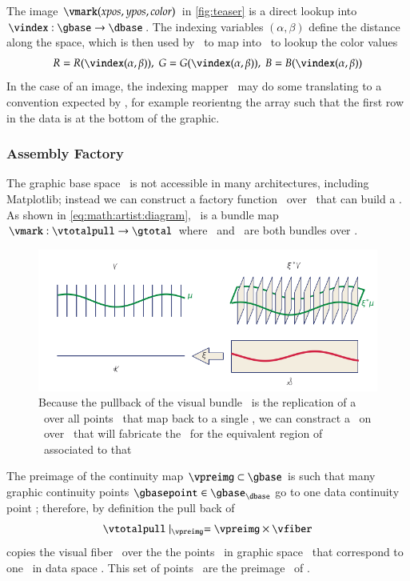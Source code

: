 \documentclass[journal]{vgtc}                %
\begin{document}
The image $\vmark(xpos, ypos, color)$ in \autoref{fig:teaser} is a direct lookup into  $\vindex:\gbase\rightarrow\dbase$. The indexing variables $(\alpha, \beta)$ define the distance along the space, which is then used by \vindex\ to map into \dbase\ to lookup the color values 
\begin{equation*}
R = R(\vindex(\alpha, \beta)), \; G = G(\vindex(\alpha, \beta)), \; B = B(\vindex(\alpha, \beta))
\end{equation*}
In the case of an image, the indexing mapper \vindex\ may do some translating to a convention expected by \vmark, for example reorientng the array such that the first row in the data is at the bottom of the graphic. 

\subsubsection{Assembly Factory}
\label{sec:math:artist:qhat}
The graphic base space \gbase\ is not accessible in many architectures, including Matplotlib; instead we can construct a factory function \vmarkd\ over \dbase\ that can build a \vmark. As shown in \autoref{eq:math:artist:diagram}, \vmark\ is a bundle map $\vmark: \vtotalpull\rightarrow \gtotal$ where \vtotalpull\ and \gtotal\ are both bundles over \gbase.
\begin{figure}[htb]
  \centering
    \includegraphics[width=1\columnwidth]{q_hat.png}
    \caption{Because the pullback of the visual bundle \vtotalpull\ is the replication of a \vsection\ over all points \gbasepoint\ that map back to a single \dbasepoint, we can constract a \vmarkd\ on \vsection\ over \dbasepoint\ that will fabricate the \vmark\ for the equivalent region of \gbasepoint\ associated to that \dbasepoint}
    \label{fig:math:artist:qhat}
\end{figure}

The preimage of the continuity map $\vpreimg \subset \gbase$ is such that many graphic continuity points $\gbasepoint \in \gbase_{\dbase}$ go to one data continuity point \dbasepoint; therefore, by definition the pull back of \vsection\
\begin{equation}
    \vtotalpull \mid_{\vpreimg} = \vpreimg \times \vfiber
\end{equation}
copies the visual fiber \vfiber\ over the the points \gbasepoint\ in graphic space \gbase\ that correspond to one \dbasepoint\ in data space \dbase. This set of points \gbasepoint\ are the preimage \vpreimg\ of \dbasepoint. 
\end{document}

